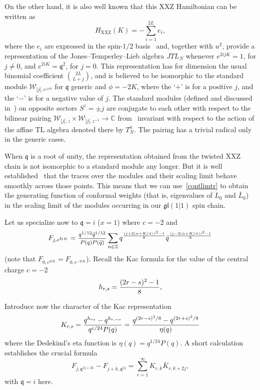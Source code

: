 \documentclass[11pt]{article}
\newcommand{\q}{\mathfrak{q}}
\newcommand{\ffrac}[2]{\mbox{\footnotesize$\displaystyle\frac{#1}{#2}$}}
\newcommand{\JTL}[1]{JTL_{#1}}
\newcommand{\ATL}[1]{T^a_{#1}}
\newcommand{\HXXZ}{H_{\mathrm{XXZ}}(K)}
\newcommand{\oC}{\mathbb{C}}
\newcommand{\oZ}{\mathbb{Z}}
\newcommand{\gl}{\mathfrak{gl}}
\newcommand{\AStTL}[2]{\mathscr{W}_{#1,#2}}
\theoremstyle{definition}
\begin{document}
On the other hand, it is also well known \cite{PasquierSaleur} that this XXZ Hamiltonian can be written  as
%
\begin{equation}
\HXXZ=-\sum_{i=1}^{2L}e_i,
\end{equation}
%
where the $e_i$ are expressed in the spin-$1/2$
basis~\cite{PasquierSaleur} and, together with $u^2$, provide a
representation of the Jones--Temperley--Lieb algebra $\JTL{N}$
whenever $e^{2ijK}=1$, for $j\neq 0$, and $e^{2iK}=\q^2$, for $j=0$.
This representation has for dimension the usual binomial coefficient
$\binom{2L}{L+j}$, and is believed to be isomorphic to the standard
module $\AStTL{|j|}{e^{\pm i\phi}}$ for $\q$ generic and $\phi=-2K$,
where the `$+$' is for a positive $j$, and the `$-$' is for a negative
value of $j$. The standard modules (defined and discussed
in~\cite{GRS2}) on opposite sectors $S^z=\pm j$ are conjugate to each
other with respect to the  bilinear pairing
$\AStTL{|j|}{z}\times\AStTL{|j|}{z^{-1}}\to\oC$ from~\cite{GL} invariant with respect to the action of the affine TL algebra denoted there by $\ATL{N}$.  The
pairing has a trivial radical only in the generic cases.


When $\q$ is a root of unity, the representation obtained from the
twisted XXZ chain is not isomorphic to a standard module any
longer. But it is well established~\cite{PasquierSaleur} that the
traces over the modules and their scaling limit behave smoothly across
those points. This means that we can use~\eqref{contlimtr} to
obtain the generating function of conformal weights (that is,
eigenvalues of $L_0$ and $\bar{L}_0$) in the scaling limit of the modules
occurring in our $\gl(1|1)$ spin chain.


 Let us
 specialize now to $\q=i$ ($x=1$) where $c=-2$ and
%
 \begin{equation}
   F_{j,e^{2iK}}=\ffrac{q^{1/12}\bar{q}^{1/12}}{P(q)P(\bar{q})}
     \sum_{n\in \oZ}q^{\left(j+2(n+K/\pi)\right)^{2}-1\over 8}
    \bar{q}^{\left(j-2(n+K/\pi)\right)^{2}-1\over 8}
     \end{equation}
(note that $F_{0,e^{2iK}}=F_{0,e^{-2iK}}$). Recall the Kac formula for the value of the central charge $c=-2$
%
 \begin{equation}
 h_{r,s}={(2r-s)^2-1\over 8},
 \end{equation}

Introduce now
the character of the Kac representation
%
\begin{equation}
K_{r,s}={q^{h_{rs}}-q^{h_{r,-s}}\over q^{c/24}P(q)}={q^{(2r-s)^2/8}-q^{(2r+s)^2/8}\over\eta(q)}
\end{equation}
%
where  the Dedekind's eta function is $\eta(q)=q^{1/24}P(q)$. A short calculation establishes the crucial formula
 \begin{equation}
 F_{j,\q^{2j+2k}}-F_{j+k,\q^{2j}}=\sum_{r=1}^\infty K_{r,k}\bar{K}_{r,k+2j}\label{useful},
 \end{equation}
 with $\q=i$ here.
\end{document}
